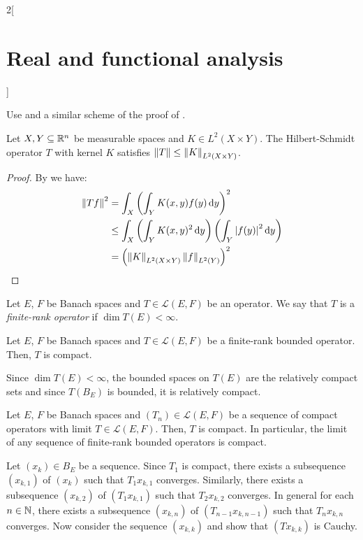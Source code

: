 \documentclass[../../../main_math.tex]{subfiles}
\begin{document}
\begin{multicols}{2}[\section{Real and functional analysis}]
\begin{proposition}
  \end{proposition}
  \begin{sproof}
    Use  and a similar scheme of the proof of .
  \end{sproof}
  \begin{proposition}
    Let $X,Y\subseteq \mathbb{R}^n$ be measurable spaces and $K\in L^2(X\times Y)$. The Hilbert-Schmidt operator $T$ with kernel $K$ satisfies $\left\|T\right\|\leq\left\|K\right\|_{L^2(X\times Y)}$.
  \end{proposition}
  \begin{proof}
    By  we have:
    \begin{align*}
      \left\|Tf\right\|^2 & =\int_X{\left(\int_YK(x,y)f(y)\dd{y}\right)}^2                                    \\
                  & \leq \int_X\left(\int_YK(x,y)^2\dd{y}\right)\left(\int_Y\abs{f(y)}^2\dd{y}\right) \\
                  & = {\left(\left\|K\right\|_{L^2(X\times Y)}\left\|f\right\|_{L^2(Y)}\right)}^2
    \end{align*}
  \end{proof}
  \begin{definition}
    Let $E$, $F$ be Banach spaces and $T\in\mathcal{L}(E,F)$ be an operator. We say that $T$ is a \emph{finite-rank operator} if $\dim T(E)<\infty$.
  \end{definition}
  \begin{lemma}\label{RFA:lemmarank}
    Let $E$, $F$ be Banach spaces and $T\in\mathcal{L}(E,F)$ be a finite-rank bounded operator. Then, $T$ is compact.
  \end{lemma}
  \begin{sproof}
    Since $\dim T(E)<\infty$, the bounded spaces on $T(E)$ are the relatively compact sets and since $T(B_E)$ is bounded, it is relatively compact.
  \end{sproof}
  \begin{proposition}
    Let $E$, $F$ be Banach spaces and $(T_n)\in\mathcal{L}(E,F)$ be a sequence of compact operators with limit $T\in\mathcal{L}(E,F)$. Then, $T$ is compact. In particular, the limit of any sequence of finite-rank bounded operators is compact.
  \end{proposition}
  \begin{sproof}
    Let $(x_k)\in B_E$ be a sequence. Since $T_1$ is compact, there exists a subsequence $(x_{k,1})$ of $(x_k)$ such that $T_1x_{k,1}$ converges. Similarly,  there exists a subsequence $(x_{k,2})$ of $(T_1x_{k,1})$ such that $T_2x_{k,2}$ converges. In general for each $n\in\mathbb{N}$, there exists a subsequence $(x_{k,n})$ of $(T_{n-1}x_{k,n-1})$ such that $T_nx_{k,n}$ converges. Now consider the sequence $(x_{k,k})$ and show that $(Tx_{k,k})$ is Cauchy.


\end{sproof}
\end{multicols}
\end{document}
